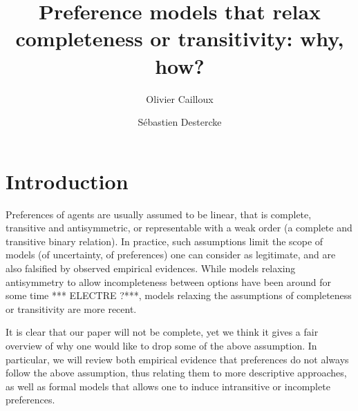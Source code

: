\documentclass[french, english]{llncs}
\begin{document}
	\title{Preference models that relax completeness or transitivity: why, how?}
	\author{Olivier Cailloux \and Sébastien Destercke}
	\maketitle
	
	
	\setlength{\parindent}{1.5em}
	
	\section{Introduction}\label{sec:intro}
	Preferences of agents are usually assumed to be linear, that is complete, transitive and antisymmetric, or representable with a weak order (a complete and transitive binary relation). In practice, such assumptions limit the scope of models (of uncertainty, of preferences) one can consider as legitimate, and are also falsified by observed empirical evidences. While models relaxing antisymmetry to allow incompleteness between options have been around for some time *** ELECTRE ?***, models relaxing the assumptions of completeness or transitivity are more recent.
	
	It is clear that our paper will not be complete, yet we think it gives a fair overview of why one would like to drop some of the above assumption. In particular, we will review both empirical evidence that preferences do not always follow the above assumption, thus relating them to more descriptive approaches, as well as formal  models that allows one to induce intransitive or incomplete preferences. 
	
\end{document}
